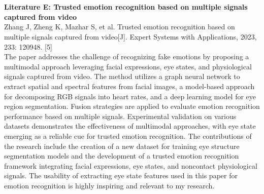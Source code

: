 \documentclass[11pt]{article}
\begin{document}
\\
\\\textbf{Literature E: Trusted emotion recognition based on multiple signals captured from video}
\\Zhang J, Zheng K, Mazhar S, et al. Trusted emotion recognition based on multiple signals captured from video[J]. Expert Systems with Applications, 2023, 233: 120948. [5]
\\The paper addresses the challenge of recognizing fake emotions by proposing a multimodal approach leveraging facial expressions, eye states, and physiological signals captured from video. The method utilizes a graph neural network to extract spatial and spectral features from facial images, a model-based approach for decomposing RGB signals into heart rates, and a deep learning model for eye region segmentation. Fusion strategies are applied to evaluate emotion recognition performance based on multiple signals. Experimental validation on various datasets demonstrates the effectiveness of multimodal approaches, with eye state emerging as a reliable cue for trusted emotion recognition. The contributions of the research include the creation of a new dataset for training eye structure segmentation models and the development of a trusted emotion recognition framework integrating facial expressions, eye states, and noncontact physiological signals. The usability of extracting eye state features used in this paper for emotion recognition is highly inspiring and relevant to my research.

\nocite{*}


\end{document}
